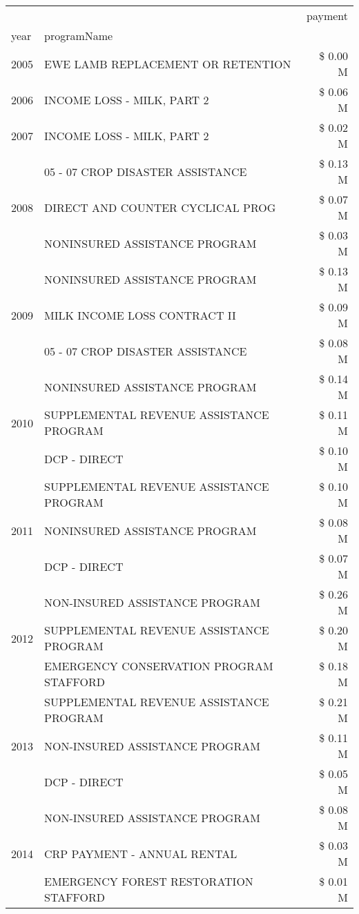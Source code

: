 \begin{tabular}{llr}
\toprule
 &  & payment \\
year & programName &  \\
\midrule
2005 & EWE LAMB REPLACEMENT OR RETENTION & \$ 0.00 M \\
\cline{1-3}
2006 & INCOME LOSS - MILK, PART 2 & \$ 0.06 M \\
\cline{1-3}
2007 & INCOME LOSS - MILK, PART 2 & \$ 0.02 M \\
\cline{1-3}
\multirow[t]{3}{*}{2008} & 05 - 07 CROP DISASTER ASSISTANCE & \$ 0.13 M \\
 & DIRECT AND COUNTER CYCLICAL PROG & \$ 0.07 M \\
 & NONINSURED ASSISTANCE PROGRAM & \$ 0.03 M \\
\cline{1-3}
\multirow[t]{3}{*}{2009} & NONINSURED ASSISTANCE PROGRAM & \$ 0.13 M \\
 & MILK INCOME LOSS CONTRACT II & \$ 0.09 M \\
 & 05 - 07 CROP DISASTER ASSISTANCE & \$ 0.08 M \\
\cline{1-3}
\multirow[t]{3}{*}{2010} & NONINSURED ASSISTANCE PROGRAM & \$ 0.14 M \\
 & SUPPLEMENTAL REVENUE ASSISTANCE PROGRAM & \$ 0.11 M \\
 & DCP - DIRECT & \$ 0.10 M \\
\cline{1-3}
\multirow[t]{3}{*}{2011} & SUPPLEMENTAL REVENUE ASSISTANCE PROGRAM & \$ 0.10 M \\
 & NONINSURED ASSISTANCE PROGRAM & \$ 0.08 M \\
 & DCP - DIRECT & \$ 0.07 M \\
\cline{1-3}
\multirow[t]{3}{*}{2012} & NON-INSURED ASSISTANCE PROGRAM & \$ 0.26 M \\
 & SUPPLEMENTAL REVENUE ASSISTANCE PROGRAM & \$ 0.20 M \\
 & EMERGENCY CONSERVATION PROGRAM STAFFORD & \$ 0.18 M \\
\cline{1-3}
\multirow[t]{3}{*}{2013} & SUPPLEMENTAL REVENUE ASSISTANCE PROGRAM & \$ 0.21 M \\
 & NON-INSURED ASSISTANCE PROGRAM & \$ 0.11 M \\
 & DCP - DIRECT & \$ 0.05 M \\
\cline{1-3}
\multirow[t]{3}{*}{2014} & NON-INSURED ASSISTANCE PROGRAM & \$ 0.08 M \\
 & CRP PAYMENT - ANNUAL RENTAL & \$ 0.03 M \\
 & EMERGENCY FOREST RESTORATION STAFFORD & \$ 0.01 M \\

\end{tabular}
